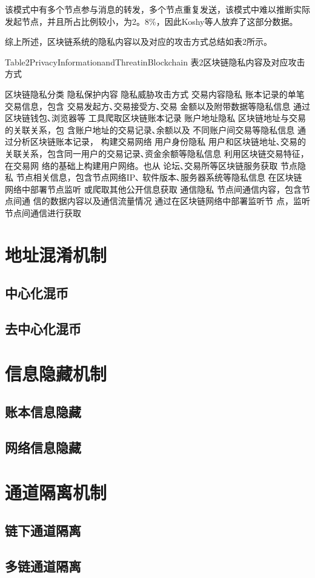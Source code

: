 该模式中有多个节点参与消息的转发，多个节点重复发送，该模式中难以推断实际发起节点，并且所占比例较小，为2。8\%，因此Koshy等人放弃了这部分数据。

综上所述，区块链系统的隐私内容以及对应的攻击方式总结如表2所示。

Table2PrivacyInformationandThreatinBlockchain
表2区块链隐私内容及对应攻击方式

区块链隐私分类	隐私保护内容	隐私威胁攻击方式
交易内容隐私	账本记录的单笔交易信息，包含
交易发起方､交易接受方､交易
金额以及附带数据等隐私信息	通过区块链钱包､浏览器等
工具爬取区块链账本记录
账户地址隐私	区块链地址与交易的关联关系，包
含账户地址的交易记录､余额以及
不同账户间交易等隐私信息	通过分析区块链账本记录，
构建交易网络
用户身份隐私	用户和区块链地址､交易的关联关系，包含同一用户的交易记录､资金余额等隐私信息	利用区块链交易特征，在交易网
络的基础上构建用户网络。也从
论坛､交易所等区块链服务获取
节点隐私	节点相关信息，包含节点网络IP､
软件版本､服务器系统等隐私信息	在区块链网络中部署节点监听
或爬取其他公开信息获取
通信隐私	节点间通信内容，包含节点间通
信的数据内容以及通信流量情况	通过在区块链网络中部署监听节
点，监听节点间通信进行获取

\section{地址混淆机制}

\subsection{中心化混币}

\subsection{去中心化混币}

\section{信息隐藏机制}

\subsection{账本信息隐藏}

\subsection{网络信息隐藏}

\section{通道隔离机制}

\subsection{链下通道隔离}

\subsection{多链通道隔离}

